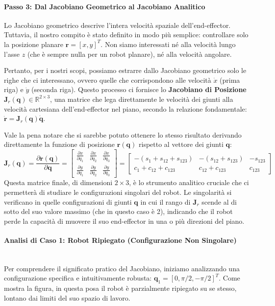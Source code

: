 ﻿\documentclass[11pt, a4paper]{article}
\begin{document}
\paragraph{Passo 3: Dal Jacobiano Geometrico al Jacobiano Analitico}
Lo Jacobiano geometrico descrive l'intera velocità spaziale dell'end-effector. Tuttavia, il nostro compito è stato definito in modo più semplice: controllare solo la posizione planare $\bm{r} = [x, y]^T$. Non siamo interessati né alla velocità lungo l'asse $z$ (che è sempre nulla per un robot planare), né alla velocità angolare.

Pertanto, per i nostri scopi, possiamo estrarre dallo Jacobiano geometrico solo le righe che ci interessano, ovvero quelle che corrispondono alle velocità $\dot{x}$ (prima riga) e $\dot{y}$ (seconda riga). Questo processo ci fornisce lo \textbf{Jacobiano di Posizione} $\bm{J}_r(\bm{q}) \in \mathbb{R}^{2 \times 3}$, una matrice che lega direttamente le velocità dei giunti alla velocità cartesiana dell'end-effector nel piano, secondo la relazione fondamentale: $\dot{\bm{r}} = \bm{J}_r(\bm{q})\dot{\bm{q}}$.

Vale la pena notare che si sarebbe potuto ottenere lo stesso risultato derivando direttamente la funzione di posizione $\bm{r}(\bm{q})$ rispetto al vettore dei giunti $\bm{q}$:
\[
    \bm{J}_r(\bm{q}) = \frac{\partial \bm{r}(\bm{q})}{\partial \bm{q}} =
    \begin{bmatrix}
        \frac{\partial x}{\partial q_1} & \frac{\partial x}{\partial q_2} & \frac{\partial x}{\partial q_3} \\
        \frac{\partial y}{\partial q_1} & \frac{\partial y}{\partial q_2} & \frac{\partial y}{\partial q_3}
    \end{bmatrix}
    =
    \begin{bmatrix}
        -(s_{1} + s_{12} + s_{123}) & -(s_{12} + s_{123}) & -s_{123} \\
        c_{1} + c_{12} + c_{123} & c_{12} + c_{123} & c_{123}
    \end{bmatrix}
\]
Questa matrice finale, di dimensioni $2 \times 3$, è lo strumento analitico cruciale che ci permetterà di studiare le configurazioni singolari del robot. Le singolarità si verificano in quelle configurazioni di giunti $\bm{q}$ in cui il rango di $\bm{J}_r$ scende al di sotto del suo valore massimo (che in questo caso è 2), indicando che il robot perde la capacità di muovere il suo end-effector in una o più direzioni del piano.

\newpage
\paragraph{Analisi di Caso 1: Robot Ripiegato (Configurazione Non Singolare)}
\mbox{}\\ %
Per comprendere il significato pratico del Jacobiano, iniziamo analizzando una configurazione specifica e intuitivamente robusta: $\bm{q}_1 = [0, \pi/2, -\pi/2]^T$. Come mostra la figura, in questa posa il robot è parzialmente ripiegato su se stesso, lontano dai limiti del suo spazio di lavoro.
\end{document}
